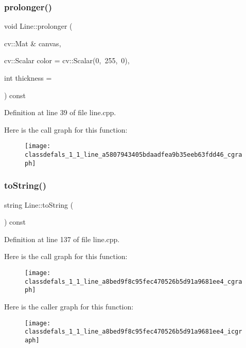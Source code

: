 \subsubsection{\texorpdfstring{prolonger()}{prolonger()}}
{\footnotesize\ttfamily void Line\+::prolonger (\begin{DoxyParamCaption}\item[{cv\+::\+Mat \&}]{canvas,  }\item[{cv\+::\+Scalar}]{color = {\ttfamily cv\+:\+:Scalar(0,~255,~0)},  }\item[{int}]{thickness = {} }\end{DoxyParamCaption}) const}



Definition at line 39 of file line.\+cpp.

Here is the call graph for this function\+:\nopagebreak
\begin{figure}[H]
\begin{center}
\leavevmode
\texttt{[image: classdefals\_1\_1\_line\_a5807943405bdaadfea9b35eeb63fdd46\_cgraph]}
\end{center}
\end{figure}
\mbox{\label{classdefals_1_1_line_a8bed9f8c95fec470526b5d91a9681ee4}} 
\subsubsection{\texorpdfstring{to\+String()}{toString()}}
{\footnotesize\ttfamily string Line\+::to\+String (\begin{DoxyParamCaption}{ }\end{DoxyParamCaption}) const}



Definition at line 137 of file line.\+cpp.

Here is the call graph for this function\+:\nopagebreak
\begin{figure}[H]
\begin{center}
\leavevmode
\texttt{[image: classdefals\_1\_1\_line\_a8bed9f8c95fec470526b5d91a9681ee4\_cgraph]}
\end{center}
\end{figure}
Here is the caller graph for this function\+:\nopagebreak
\begin{figure}[H]
\begin{center}
\leavevmode
\texttt{[image: classdefals\_1\_1\_line\_a8bed9f8c95fec470526b5d91a9681ee4\_icgraph]}
\end{center}
\end{figure}
\mbox{\label{classdefals_1_1_line_a1ff7ede93d7ac87e25ea55879de1665b}} 
